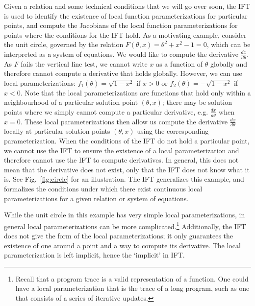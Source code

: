 \documentclass[11pt]{article}
\begin{document}
Given a relation and some technical conditions that we will go over soon,
the IFT is used to identify the existence of local
function parameterizations for particular points,
and compute the Jacobians of the local function parameterizations for points
where the conditions for the IFT hold.
As a motivating example, consider the unit circle,
governed by the relation $F(\theta,x) = \theta^2 + x^2 - 1 = 0$,
which can be interpreted as a system of equations.
We would like to compute the derivative $\frac{dx}{d\theta}$.
As $F$ fails the vertical line test, we cannot write $x$ as a function of $\theta$ globally
and therefore cannot compute a derivative that holds globally.
However, we can use local parameterizations: $f_1(\theta) = \sqrt{1-x^2}$ if $x > 0$
or $f_2(\theta) = -\sqrt{1-x^2}$ if $x<0$.
Note that the local parameterizations are functions that hold
only within a neighbourhood of a particular solution point $(\theta,x)$;
there may be solution points where we simply cannot compute a particular derivative,
e.g. $\frac{dx}{d\theta}$ when $x=0$.
These local parameterizations then allow us compute the derivative $\frac{dx}{d\theta}$
locally at particular solution points $(\theta,x)$ using the corresponding parameterization.
When the conditions of the IFT do not hold a particular point,
we cannot use the IFT to ensure the existence of a local parameterization
and therefore cannot use the IFT to compute derivatives.
In general, this does not mean that the derivative does not exist,
only that the IFT does not know what it is.
See Fig.~\ref{fig:circle} for an illustration.
The IFT generalizes this example, and formalizes the conditions under which there exist
continuous local parameterizations for a given relation or system of equations.

While the unit circle in this example has very simple local parameterizations,
in general local parameterizations can be more complicated.\footnote{
Recall that a program trace is a valid representation of a function.
One could have a local parameterization that is the trace of a long program,
such as one that consists of a series of iterative updates.
}
Additionally, the IFT does not give the form of the local parameterizations;
it only guarantees the existence of one around a point and a way to compute its derivative.
The local parameterization is left implicit, hence the `implicit' in IFT.
\end{document}
